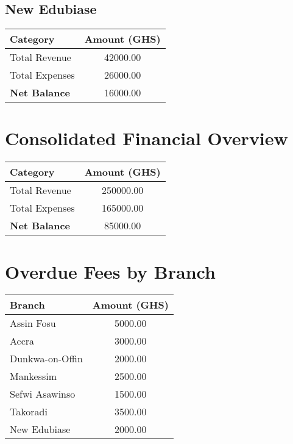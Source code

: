 \documentclass[a4paper,12pt]{article}
\begin{document}
\subsection*{New Edubiase}
\begin{tabular}{l S[table-format=6.2]}
    \toprule
    \textbf{Category} & \textbf{Amount (GHS)} \\
    \midrule
    Total Revenue & 42000.00 \\
    Total Expenses & 26000.00 \\
    \midrule
    \textbf{Net Balance} & 16000.00 \\
    \bottomrule
\end{tabular}

\section*{Consolidated Financial Overview}
\begin{tabular}{l S[table-format=6.2]}
    \toprule
    \textbf{Category} & \textbf{Amount (GHS)} \\
    \midrule
    Total Revenue & 250000.00 \\
    Total Expenses & 165000.00 \\
    \midrule
    \textbf{Net Balance} & 85000.00 \\
    \bottomrule
\end{tabular}

\section*{Overdue Fees by Branch}
\begin{tabular}{l S[table-format=6.2]}
    \toprule
    \textbf{Branch} & \textbf{Amount (GHS)} \\
    \midrule
    Assin Fosu & 5000.00 \\
    Accra & 3000.00 \\
    Dunkwa-on-Offin & 2000.00 \\
    Mankessim & 2500.00 \\
    Sefwi Asawinso & 1500.00 \\
    Takoradi & 3500.00 \\
    New Edubiase & 2000.00 \\
    \bottomrule
\end{tabular}
\end{document}
